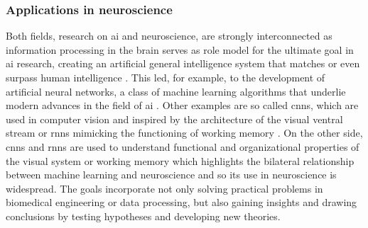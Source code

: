 \subsubsection{Applications in neuroscience}
Both fields, research on \gls{ai} and neuroscience, are strongly interconnected as information processing in the brain serves as role model for the ultimate goal in \gls{ai} research, creating an artificial general intelligence system that matches or even surpass human intelligence \cite{Macpherson2021}. This led, for example, to the development of artificial neural networks, a class of machine learning algorithms that underlie modern advances in the field of \gls{ai} \cite{Cox2014}. Other examples are so called \glspl{cnn}, which are used in computer vision and inspired by the architecture of the visual ventral stream or \glspl{rnn} mimicking the functioning of working memory \cite{Macpherson2021, Fukushima1982, Yin2020}. On the other side, \glspl{cnn} and \glspl{rnn} are used to understand functional and organizational properties of the visual system \cite{Yamins2014} or working memory \cite{Kim2021} which highlights the bilateral relationship between machine learning and neuroscience and so its use in neuroscience is widespread. The goals incorporate not only solving practical problems in biomedical engineering or data processing, but also gaining insights and drawing conclusions by testing hypotheses and developing new theories.\\
